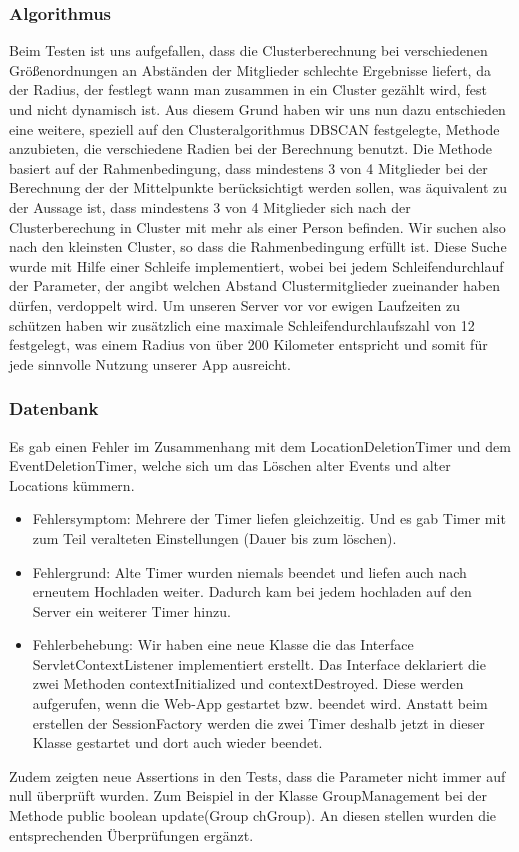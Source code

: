 \documentclass{scrartcl}
\begin{document}
\subsubsection{Algorithmus}
Beim Testen ist uns aufgefallen, dass die Clusterberechnung bei verschiedenen Größenordnungen an Abständen der Mitglieder schlechte Ergebnisse  liefert, da der Radius, der festlegt wann man zusammen in ein Cluster gezählt wird, fest und nicht dynamisch ist. Aus diesem Grund haben wir uns nun dazu entschieden eine weitere, speziell auf den Clusteralgorithmus DBSCAN festgelegte, Methode anzubieten, die verschiedene Radien bei der Berechnung benutzt. Die Methode basiert auf der Rahmenbedingung, dass mindestens 3 von 4 Mitglieder bei der Berechnung der der Mittelpunkte berücksichtigt werden sollen, was äquivalent zu der Aussage ist, dass mindestens 3 von 4 Mitglieder sich nach der Clusterberechung in Cluster mit mehr als einer Person befinden. Wir suchen also nach den kleinsten Cluster, so dass die Rahmenbedingung erfüllt ist. Diese Suche wurde mit Hilfe einer Schleife implementiert, wobei bei jedem Schleifendurchlauf der Parameter, der angibt welchen Abstand Clustermitglieder zueinander haben dürfen, verdoppelt wird. Um unseren Server vor vor ewigen Laufzeiten zu schützen haben wir zusätzlich eine maximale Schleifendurchlaufszahl von 12 festgelegt, was einem Radius von über 200 Kilometer entspricht und somit für jede sinnvolle Nutzung unserer App ausreicht.
\subsubsection{Datenbank}
Es gab einen Fehler im Zusammenhang mit dem LocationDeletionTimer und dem EventDeletionTimer, welche sich um das Löschen alter Events und alter Locations kümmern.
\begin{itemize} 
\item Fehlersymptom:
Mehrere der Timer liefen gleichzeitig. Und es gab Timer mit zum Teil veralteten Einstellungen (Dauer bis zum löschen).
\item Fehlergrund:
Alte Timer wurden niemals beendet und liefen auch nach erneutem Hochladen weiter. Dadurch kam bei jedem hochladen auf den Server ein weiterer Timer hinzu.
\item Fehlerbehebung:
Wir haben eine neue Klasse die das Interface ServletContextListener implementiert erstellt. Das Interface deklariert die zwei Methoden contextInitialized und contextDestroyed. Diese werden aufgerufen, wenn die Web-App gestartet bzw. beendet wird.
Anstatt beim erstellen der SessionFactory werden die zwei Timer deshalb jetzt in dieser Klasse gestartet und dort auch wieder beendet.
\end{itemize}
Zudem zeigten neue Assertions in den Tests, dass die Parameter nicht immer auf null überprüft wurden. Zum Beispiel in der Klasse GroupManagement bei der Methode public boolean update(Group chGroup). An diesen stellen wurden die entsprechenden Überprüfungen ergänzt.\newline
\end{document}
